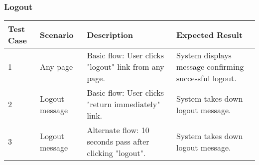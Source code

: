 \subsubsection{Logout}
\begin{table}[!h]
    \begin{tabular}{|l|l|l|l|}
        \hline
        Test Case   & Scenario        & Description                           & Expected Result \\ \hline
        1        & Any page                             & Basic flow: User clicks "logout" link from any page.    & System displays message confirming successful logout.      \\ \hline
        2        & Logout message                  & Basic flow: User clicks "return immediately" link.    & System takes down logout message.         \\ \hline
        3        & Logout message                  & Alternate flow: 10 seconds pass after clicking "logout".   & System takes down logout message.       \\ \hline
    \end{tabular}
\end{table}

